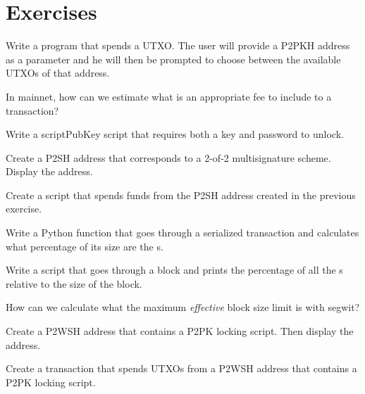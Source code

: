 \section{Exercises}

\begin{exercise}
Write a program that spends a UTXO. The user will provide a P2PKH address as a parameter and he will then be prompted to choose between the available UTXOs of that address.
\end{exercise}

\begin{exercise}
In mainnet, how can we estimate what is an appropriate fee to include to a transaction?
\end{exercise}

\begin{exercise}
Write a scriptPubKey script that requires both a key and password to unlock.
\end{exercise}

\begin{exercise}
Create a P2SH address that corresponds to a 2-of-2 multisignature scheme. Display the address.
\end{exercise}

\begin{exercise}
Create a script that spends funds from the P2SH address created in the previous exercise.
\end{exercise}

\begin{exercise}
Write a Python function that goes through a serialized transaction and calculates what percentage of its size are the s.
\end{exercise}

\begin{exercise}
Write a script that goes through a block and prints the percentage of all the s relative to the size of the block.
\end{exercise}

\begin{exercise}
How can we calculate what the maximum \emph{effective} block size limit is with segwit?
\end{exercise}

\begin{exercise}
Create a P2WSH address that contains a P2PK locking script. Then display the address.
\end{exercise}

\begin{exercise}
Create a transaction that spends UTXOs from a P2WSH address that contains a P2PK locking script.
\end{exercise}

